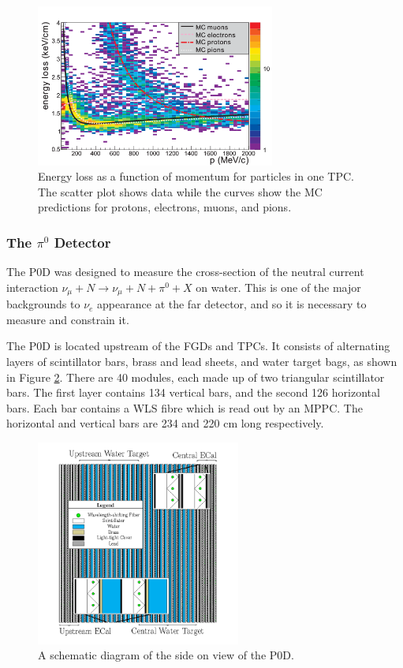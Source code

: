 \begin{figure}[!htbp]
\centering
\includegraphics*[width=0.7\textwidth,clip]{figs/tpcpid}
\caption{Energy loss as a function of momentum for particles in one TPC. The scatter plot shows data while the curves show the MC predictions for protons, electrons, muons, and pions.} \label{fig:tpcpid}
\end{figure}


\subsubsection{The $\pi^0$ Detector}\label{sec:pod}

The P0D was designed to measure the cross-section of the neutral current interaction $\nu_\mu + N \rightarrow \nu_\mu + N + \pi^0 + X$ on water. This is one of the major backgrounds to $\nu_e$ appearance at the far detector, and so it is necessary to measure and constrain it.

The P0D is located upstream of the FGDs and TPCs. It consists of alternating layers of scintillator bars, brass and lead sheets, and water target bags, as shown in Figure \ref{fig:podconstruction}. There are 40 modules, each made up of two triangular scintillator bars. The first layer contains 134 vertical bars, and the second 126 horizontal bars. Each bar contains a WLS fibre which is read out by an MPPC. The horizontal and vertical bars are 234 and 220 cm long respectively.

\begin{figure}[!htbp]
\centering
\includegraphics*[width=0.6\textwidth,clip]{figs/podconstruction}
\caption{A schematic diagram of the side on view of the P0D.}\label{fig:podconstruction}
\end{figure}

